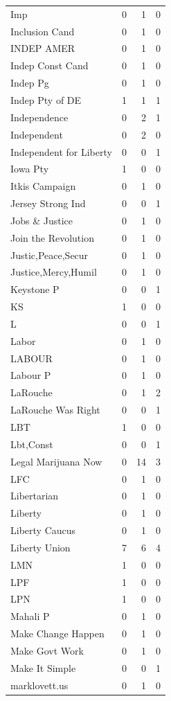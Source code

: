 \begin{supertabular}{lrrr}
Imp & 0 & 1 & 0\\
Inclusion Cand & 0 & 1 & 0\\
INDEP AMER & 0 & 1 & 0\\
Indep Const Cand & 0 & 1 & 0\\
Indep Pg & 0 & 1 & 0\\
Indep Pty of DE & 1 & 1 & 1\\
Independence & 0 & 2 & 1\\
Independent & 0 & 2 & 0\\
Independent for Liberty & 0 & 0 & 1\\
Iowa Pty & 1 & 0 & 0\\
Itkis Campaign & 0 & 1 & 0\\
Jersey Strong Ind & 0 & 0 & 1\\
Jobs \& Justice & 0 & 1 & 0\\
Join the Revolution & 0 & 1 & 0\\
Justic,Peace,Secur & 0 & 1 & 0\\
Justice,Mercy,Humil & 0 & 1 & 0\\
Keystone P & 0 & 0 & 1\\
KS & 1 & 0 & 0\\
L & 0 & 0 & 1\\
Labor & 0 & 1 & 0\\
LABOUR & 0 & 1 & 0\\
Labour P & 0 & 1 & 0\\
LaRouche & 0 & 1 & 2\\
LaRouche Was Right & 0 & 0 & 1\\
LBT & 1 & 0 & 0\\
Lbt,Const & 0 & 0 & 1\\
Legal Marijuana Now & 0 & 14 & 3\\
LFC & 0 & 1 & 0\\
Libertarian & 0 & 1 & 0\\
Liberty & 0 & 1 & 0\\
Liberty Caucus & 0 & 1 & 0\\
Liberty Union & 7 & 6 & 4\\
LMN & 1 & 0 & 0\\
LPF & 1 & 0 & 0\\
LPN & 1 & 0 & 0\\
Mahali P & 0 & 1 & 0\\
Make Change Happen & 0 & 1 & 0\\
Make Govt Work & 0 & 1 & 0\\
Make It Simple & 0 & 0 & 1\\
marklovett.us & 0 & 1 & 0\\

\end{supertabular}
